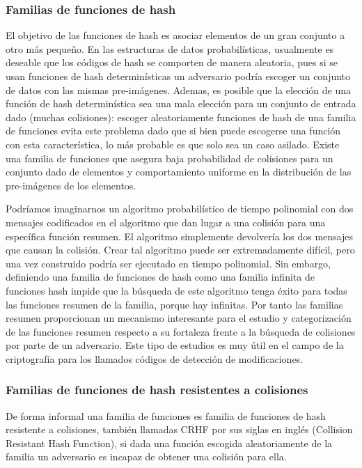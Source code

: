 \documentclass[a4paper,12pt, oneside]{article}
\begin{document}
\subsubsection{Familias de funciones de hash}
El objetivo de las funciones de hash es asociar elementos de un gran conjunto a otro más pequeño. En las estructuras de datos probabilísticas, usualmente es deseable que los códigos de hash se comporten de manera aleatoria, pues si se usan funciones de hash determinísticas un adversario podría escoger un conjunto de datos con las mismas pre-imágenes. Ademas, es posible que la elección de una función de hash determinística sea una mala elección para un conjunto de entrada dado (muchas colisiones): escoger aleatoriamente funciones de hash de una familia de funciones evita este problema dado que si bien puede escogerse una función con esta característica, lo más probable es que solo sea un caso asilado.
Existe una familia de funciones que asegura baja probabilidad de colisiones para un conjunto dado de elementos y comportamiento uniforme en la distribución de las pre-imágenes de los elementos\cite{WEGMAN1981265}.

Podríamos imaginarnos un algoritmo probabilístico de tiempo polinomial con dos mensajes codificados en el algoritmo que dan lugar a una colisión para una específica función resumen. El algoritmo simplemente devolvería los dos mensajes que causan la colisión. Crear tal algoritmo puede ser extremadamente difícil, pero una vez construido podría ser ejecutado en tiempo polinomial. Sin embargo, definiendo una familia de funciones de hash como una familia infinita de funciones hash impide que la búsqueda de este algoritmo tenga éxito para todas las funciones resumen de la familia, porque hay infinitas. Por tanto las familias resumen proporcionan un mecanismo interesante para el estudio y categorización de las funciones resumen respecto a su fortaleza frente a la búsqueda de colisiones por parte de un adversario. Este tipo de estudios es muy útil en el campo de la criptografía para los llamados códigos de detección de modificaciones.


\subsubsection{Familias de funciones de hash resistentes a colisiones}
De forma informal una familia de funciones es familia de funciones de hash resistente a colisiones, también llamadas CRHF por sus siglas en inglés (Collision Resistant Hash Function), si dada una función escogida aleatoriamente de la familia un adversario es incapaz de obtener una colisión para ella\cite{chunyuean}.
\end{document}

